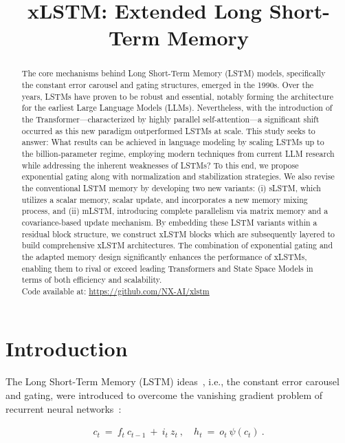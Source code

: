 \title{xLSTM: Extended Long Short-Term Memory}

\begin{abstract}
The core mechanisms behind Long Short-Term Memory (LSTM) models, specifically the constant error carousel and gating structures, emerged in the 1990s. Over the years, LSTMs have proven to be robust and essential, notably forming the architecture for the earliest Large Language Models (LLMs). Nevertheless, with the introduction of the Transformer—characterized by highly parallel self-attention—a significant shift occurred as this new paradigm outperformed LSTMs at scale. This study seeks to answer: What results can be achieved in language modeling by scaling LSTMs up to the billion-parameter regime, employing modern techniques from current LLM research while addressing the inherent weaknesses of LSTMs? To this end, we propose exponential gating along with normalization and stabilization strategies. We also revise the conventional LSTM memory by developing two new variants: (i) sLSTM, which utilizes a scalar memory, scalar update, and incorporates a new memory mixing process, and (ii) mLSTM, introducing complete parallelism via matrix memory and a covariance-based update mechanism. By embedding these LSTM variants within a residual block structure, we construct xLSTM blocks which are subsequently layered to build comprehensive xLSTM architectures. The combination of exponential gating and the adapted memory design significantly enhances the performance of xLSTMs, enabling them to rival or exceed leading Transformers and State Space Models in terms of both efficiency and scalability.\\
Code available at: \url{https://github.com/NX-AI/xlstm}
\end{abstract}

\section{Introduction}
\label{sec:intro}

The Long Short-Term Memory (LSTM) ideas~\citep{Hochreiter:91,Hochreiter:97nips,Hochreiter:97}, i.e., the constant error carousel and gating, were introduced to overcome the vanishing gradient problem of recurrent neural networks~\citep{Hochreiter:91,Hochreiter:00book}:

\begin{align}
\label{eq:lstm_idea}
  c_t \ = \ f_t \ c_{t-1} \ + \ 
          i_t \  z_t \ , \quad  
          h_t \ = \ o_t \ \psi({c_t}) \ . 
\end{align}

